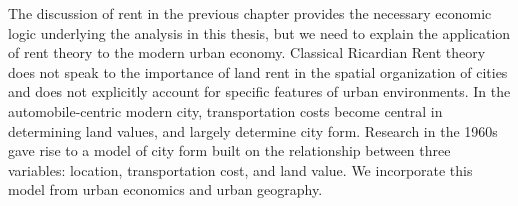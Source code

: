






The discussion of rent in the previous chapter provides the necessary economic logic
underlying the analysis in this thesis, but we need to explain the application of rent theory to the modern urban economy. Classical Ricardian Rent theory does not speak to the importance of land rent in the spatial organization of cities and does not explicitly account for specific features of urban environments.  In the automobile-centric modern city, transportation costs become central in determining land values, and largely determine city form. Research in the 1960s gave rise to a model of city form built on the relationship between three variables: location, transportation cost, and land value. We incorporate this model from urban economics and urban geography. 


